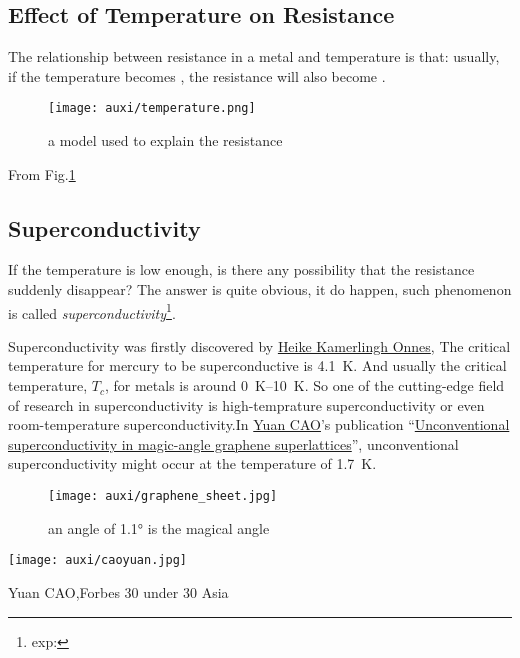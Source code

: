 \documentclass[a4paper]{tufte-handout}
\begin{document}
\subsection{Effect of Temperature on Resistance}
The relationship between resistance in a metal and temperature is that: usually, if the temperature becomes \uline{\hspace{1in}}, the resistance will also become \uline{\hspace{1in}}.

\begin{figure}[h]
\centering
\texttt{[image: auxi/temperature.png]}
\caption{a model used to explain the resistance}
\label{fig:model}
\end{figure}

From Fig.\ref{fig:model}


\subsection{Superconductivity}
If the temperature is low enough, is there any possibility that the resistance suddenly disappear? The answer is quite obvious, it do happen, such phenomenon is called \emph{superconductivity}\footnote{exp: }.

Superconductivity was firstly discovered by \href{https://en.wikipedia.org/wiki/Heike_Kamerlingh_Onnes}{Heike Kamerlingh Onnes}, The critical temperature for mercury to be superconductive is \SI{4.1}{\K}. And usually the critical temperature, $T_c$, for metals is around \SIrange{0}{10}{\K}. So one of the cutting-edge field of research in superconductivity is high-temprature superconductivity or even room-temperature superconductivity.In \href{https://caoyuan.scripts.mit.edu}{Yuan CAO}'s publication ``\href{https://www.nature.com/articles/nature26160}{Unconventional superconductivity in magic-angle graphene superlattices}'', unconventional superconductivity might occur at the temperature of \SI{1.7}{\K}.
\begin{figure}[h]
\centering
\texttt{[image: auxi/graphene\_sheet.jpg]}
\caption{an angle of \ang{1.1} is the magical angle}
\end{figure}

\begin{marginfigure}[+3cm] %
\centering
\texttt{[image: auxi/caoyuan.jpg]}
\caption{Yuan CAO,Forbes 30 under 30 Asia}
\end{marginfigure}
\end{document}
